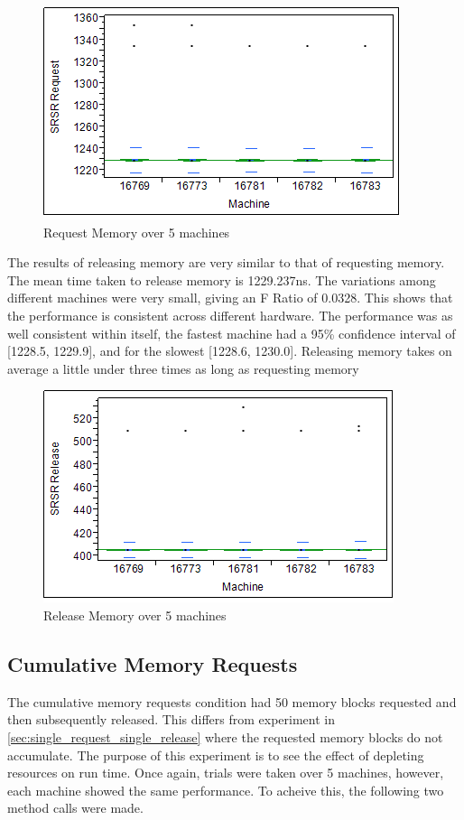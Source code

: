 \documentclass[12pt,twocolumn]{report}
\begin{document}
\begin{figure}[h!]
  \centering
    \includegraphics{SRSRRequestMemory.png}
  \caption{Request Memory over 5 machines}
\end{figure}

The results of releasing memory are very similar to that of requesting memory. The mean time taken to release memory is 1229.237ns. The variations among different machines were very small, giving an F Ratio of 0.0328. This shows that the performance is consistent across different hardware. The performance was as well consistent within itself, the fastest machine had a 95\% confidence interval of [1228.5, 1229.9], and for the slowest [1228.6, 1230.0]. Releasing memory takes on average a little under three times as long as requesting memory

\begin{figure}[h!]
  \centering
    \includegraphics{SRSRReleaseMemory.png}
  \caption{Release Memory over 5 machines}
\end{figure}

\subsection{Cumulative Memory Requests}
\label{sec:cumulative_memory_requests}

\par The cumulative memory requests condition had 50 memory blocks requested and then subsequently released. This differs from experiment in \ref{sec:single_request_single_release} where the requested memory blocks do not accumulate. The purpose of this experiment is to see the effect of depleting resources on run time. Once again, trials were taken over 5 machines, however, each machine showed the same performance. To acheive this, the following two method calls were made.
\end{document}
